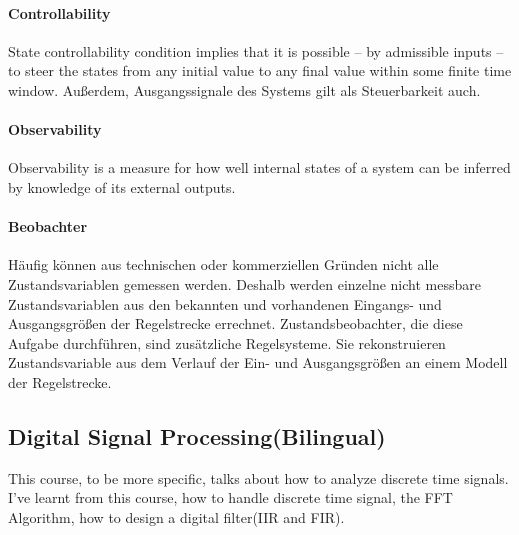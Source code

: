 \paragraph{Controllability} State controllability condition implies that it is possible – by admissible inputs – to steer the states from any initial value to any final value within some finite time window.  Au\ss erdem, Ausgangssignale des Systems gilt als Steuerbarkeit auch.

\paragraph{Observability} Observability is a measure for how well internal states of a system can be inferred by knowledge of its external outputs.


\paragraph{Beobachter}

Häufig können aus technischen oder kommerziellen Gründen nicht alle Zustandsvariablen gemessen werden. Deshalb werden einzelne nicht messbare Zustandsvariablen aus den bekannten und vorhandenen Eingangs- und Ausgangsgrößen der Regelstrecke errechnet. Zustandsbeobachter, die diese Aufgabe durchführen, sind zusätzliche Regelsysteme. Sie rekonstruieren Zustandsvariable aus dem Verlauf der Ein- und Ausgangsgrößen an einem Modell der Regelstrecke.

\subsection{Digital Signal Processing(Bilingual)}
This course, to be more specific, talks about how to analyze discrete time signals. I've learnt from this course, how to handle discrete time signal, the FFT Algorithm, how to design a digital filter(IIR and FIR).

